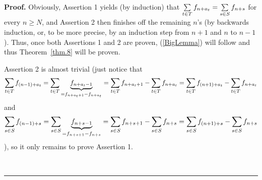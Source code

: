 \documentclass[numbers=enddot,12pt,final,onecolumn,notitlepage]{scrartcl}%
\numberwithin{exer}{section}
\theoremstyle{definition}
\newenvironment{proof}[1][Proof]{\noindent\textbf{#1.} }{\ \rule{0.5em}{0.5em}}
\let\sumnonlimits\sum
\renewcommand{\sum}{\sumnonlimits\limits}
\begin{document}
\begin{proof}
Obviously, Assertion 1 yields (by induction) that $\sum\limits_{t\in
T}f_{n+a_{t}}=\sum\limits_{s\in S}f_{n+s}$ for every $n\geq N$, and Assertion
2 then finishes off the remaining $n$'s (by backwards induction, or, to be
more precise, by an induction step from $n+1$ and $n$ to $n-1$). Thus, once
both Assertions 1 and 2 are proven, (\ref{BigLemma}) will follow and thus
Theorem~\ref{thm.8} will be proven.

Assertion 2 is almost trivial (just notice that%
\[
\sum\limits_{t\in T}f_{\left(  n-1\right)  +a_{t}}=\sum\limits_{t\in
T}\underbrace{f_{n+a_{t}-1}}_{=f_{n+a_{t}+1}-f_{n+a_{t}}}=\sum\limits_{t\in
T}f_{n+a_{t}+1}-\sum\limits_{t\in T}f_{n+a_{t}}=\sum\limits_{t\in T}f_{\left(
n+1\right)  +a_{t}}-\sum\limits_{t\in T}f_{n+a_{t}}%
\]
and%
\[
\sum\limits_{s\in S}f_{\left(  n-1\right)  +s}=\sum\limits_{s\in
S}\underbrace{f_{n+s-1}}_{=f_{n+s+1}-f_{n+s}}=\sum\limits_{s\in S}%
f_{n+s+1}-\sum\limits_{s\in S}f_{n+s}=\sum\limits_{s\in S}f_{\left(
n+1\right)  +s}-\sum\limits_{s\in S}f_{n+s}%
\]
), so it only remains to prove Assertion 1.


\end{proof}
\end{document}
